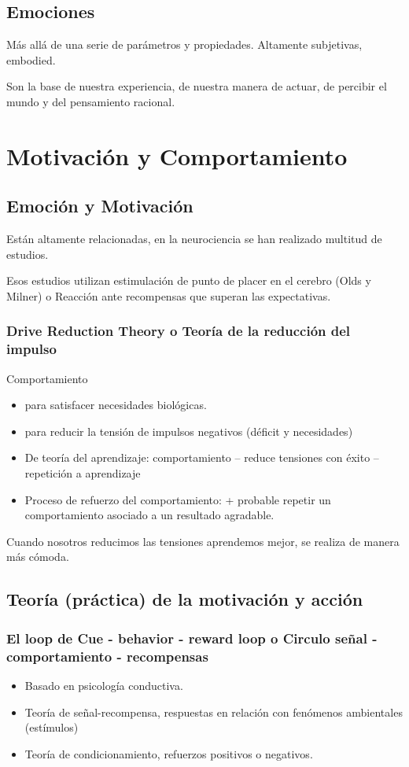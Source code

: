 \documentclass[12pt, twoside, openright]{report} %
\begin{document}
\subsection{Emociones}
Más allá de una serie de parámetros y propiedades. Altamente subjetivas, embodied.

Son la base de nuestra experiencia, de nuestra manera de actuar, de percibir el mundo y del pensamiento racional.

\section{Motivación y Comportamiento}
\subsection{Emoción y Motivación}
Están altamente relacionadas, en la neurociencia se han realizado multitud de estudios.

Esos estudios utilizan estimulación de punto de placer en el cerebro (Olds y Milner) o Reacción ante recompensas que superan las expectativas.
\pagebreak
\subsubsection{Drive Reduction Theory o Teoría de la reducción del impulso}
Comportamiento
\begin{itemize}
	\item para satisfacer necesidades biológicas.
	\item para reducir la tensión de impulsos negativos (déficit y necesidades)
	\item De teoría del aprendizaje: comportamiento – reduce tensiones con éxito – repetición a aprendizaje
	\item Proceso de refuerzo del comportamiento: + probable repetir un comportamiento asociado a un resultado agradable.
\end{itemize}
Cuando nosotros reducimos las tensiones aprendemos mejor, se realiza de manera más cómoda.

\subsection{Teoría (práctica) de la motivación y acción}
\subsubsection{El loop de Cue - behavior - reward loop o Circulo señal - comportamiento - recompensas}
\begin{itemize}
	\item Basado en psicología conductiva.
	\item Teoría de señal-recompensa, respuestas en relación con fenómenos ambientales (estímulos)
	\item Teoría de condicionamiento, refuerzos positivos o negativos.
\end{itemize}
\end{document}
